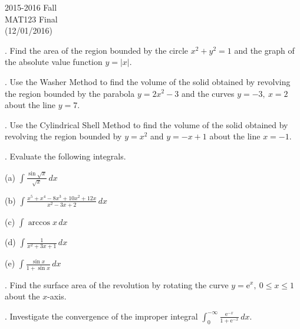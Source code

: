 \documentclass{article}
\begin{document}
\pagestyle{empty}
\large

\begin{center}
2015-2016 Fall \\MAT123 Final\\(12/01/2016)
\end{center}

. Find the area of the region bounded by the circle $x^2+y^2=1$ and the graph of the absolute value function $y=\left|x\right|$.

\hfill

. Use the Washer Method to find the volume of the solid obtained by revolving the region bounded by the parabola $y=2x^2-3$ and the curves $y=-3,\:x=2$ about the line $y=7$.

\hfill

. Use the Cylindrical Shell Method to find the volume of the solid obtained by revolving the region bounded by $y=x^2$ and $y=-x+1$ about the line $x=-1$.

\hfill

. Evaluate the following integrals.

\hfill

\noindent (a) $\displaystyle\int\frac{\sin \sqrt x}{\sqrt x}\,dx$

\hfill

\hfill

\noindent (b) $\displaystyle\int\frac{x^5+x^4-8x^3+10x^2+12x}{x^2-3x+2}\,dx$

\hfill

\hfill

\noindent (c) $\displaystyle\int\arccos x\,dx$

\hfill

\hfill

\noindent (d) $\displaystyle\int\frac1{x^2+3x+1}\,dx$

\hfill

\hfill

\noindent (e) $\displaystyle\int\frac{\sin x}{1+\sin x}\,dx$

\hfill

\hfill

. Find the surface area of the revolution by rotating the curve $y=\mathrm{e}^x,\:0\leq x\leq1$ about the $x$-axis.

\hfill

. Investigate the convergence of the improper integral $\displaystyle\int_0^{-\infty}\frac{\mathrm{e}^{-x}}{1+\mathrm{e}^{-x}}\,dx$.
\end{document}
